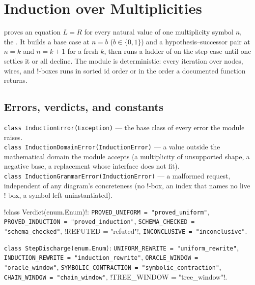 \section{Induction over Multiplicities}\label{sec:kernel-induction}

 proves an equation $L=R$ for every natural value of one multiplicity symbol $n$, the . It builds a base case at $n=b$ ($b\in\{0,1\}$) and a hypothesis--successor pair at $n=k$ and $n=k+1$ for a fresh  $k$, then runs a ladder of  on the step case until one settles it or all decline. The module is deterministic: every iteration over nodes, wires, and !-boxes runs in sorted id order or in the order a documented function returns.

\subsection{Errors, verdicts, and constants}

\begin{signature}
\texttt{class InductionError(\allowbreak{}Exception)} --- the base class of every error the module raises.\\
\texttt{class InductionDomainError(\allowbreak{}InductionError)} --- a value outside the mathematical domain the module accepts (a multiplicity of unsupported shape, a negative base, a replacement whose interface does not fit).\\
\texttt{class InductionGrammarError(\allowbreak{}InductionError)} --- a malformed request, independent of any diagram's concreteness (no !-box, an index that names no live !-box, a symbol left uninstantiated).
\end{signature}

\begin{signature}
\py!class Verdict(enum.Enum)!: \texttt{PROVED\_\allowbreak{}UNIFORM = "proved\_\allowbreak{}uniform"}, \texttt{PROVED\_\allowbreak{}INDUCTION = "proved\_\allowbreak{}induction"}, \texttt{SCHEMA\_\allowbreak{}CHECKED = "schema\_\allowbreak{}checked"}, \py!REFUTED = "refuted"!, \texttt{INCONCLUSIVE = "inconclusive"}.

\texttt{class StepDischarge(\allowbreak{}enum.\allowbreak{}Enum)}: \texttt{UNIFORM\_\allowbreak{}REWRITE = "uniform\_\allowbreak{}rewrite"}, \texttt{INDUCTION\_\allowbreak{}REWRITE = "induction\_\allowbreak{}rewrite"}, \texttt{ORACLE\_\allowbreak{}WINDOW = "oracle\_\allowbreak{}window"}, \texttt{SYMBOLIC\_\allowbreak{}CONTRACTION = "symbolic\_\allowbreak{}contraction"}, \texttt{CHAIN\_\allowbreak{}WINDOW = "chain\_\allowbreak{}window"}, \py!TREE_WINDOW = "tree_window"!.
\end{signature}

